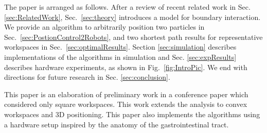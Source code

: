 The paper is arranged as follows. 
After a review of recent related work in Sec.  \ref{sec:RelatedWork},
  Sec.~\ref{sec:theory} introduces a  model for boundary interaction.   
We provide an algorithm to arbitrarily position two particles in Sec.~\ref{sec:PostionControl2Robots},  and two shortest path results for representative workspaces in Sec.~\ref{sec:optimalResults}.
 Section  \ref{sec:simulation} describes implementations of the algorithms in simulation and  Sec.  \ref{sec:expResults} describes hardware experiments, as shown in Fig.~\ref{fig:IntroPic}. 
 We end with directions for future research in Sec.  \ref{sec:conclusion}.

This paper is an elaboration of preliminary work in a conference paper \cite{shahrokhi2017algorithms} which considered only square workspaces. This work extends the analysis to convex workspaces and 3D positioning. This paper also implements the algorithms using a hardware setup inspired by the anatomy of the gastrointestinal tract.


